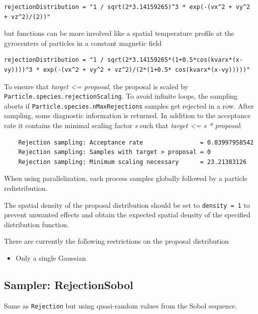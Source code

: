 \documentclass[11pt]{article}
\begin{document}
\begin{lstlisting}[language=pkgconfig]
    rejectionDistribution = "1 / sqrt(2*3.14159265)^3 * exp(-(vx^2 + vy^2 + vz^2)/(2))"
\end{lstlisting}

but functions can be more involved like a spatial temperature profile at the gyrocenters of particles in a constant magnetic field

\begin{lstlisting}[language=pkgconfig]
    rejectionDistribution = "1 / sqrt(2*3.14159265*(1+0.5*cos(kvarx*(x-vy))))^3 * exp(-(vx^2 + vy^2 + vz^2)/(2*(1+0.5* cos(kvarx*(x-vy)))))"
\end{lstlisting}

To ensure that \textit{target <= proposal}, the proposal is scaled by \verb|Particle.species.rejectionScaling|. To avoid infinite loops, the sampling aborts if \verb|Particle.species.nMaxRejections| samples get rejected in a row. After sampling, some diagnostic information is returned. In addition to the acceptance rate it contains the minimal scaling factor \textit{s} such that \textit{target <= s * proposal}:

\begin{lstlisting}
    Rejection sampling: Acceptance rate                = 0.03997958542
    Rejection sampling: Samples with target > proposal = 0
    Rejection sampling: Minimum scaling necessary      = 23.21383126
\end{lstlisting}

When using parallelization, each process samples globally followed by a particle redistribution.

\begin{note}
    The spatial density of the proposal distribution should be set to \verb|density = 1| to prevent unwanted effects and obtain the expected spatial density of the specified distribution function.

    There are currently the following restrictions on the proposal distribution
    \begin{itemize}
        \item Only a single Gaussian
    \end{itemize}
\end{note}

\subsection{Sampler: RejectionSobol}
Same as \verb|Rejection| but using quasi-random values from the Sobol sequence.
\end{document}
